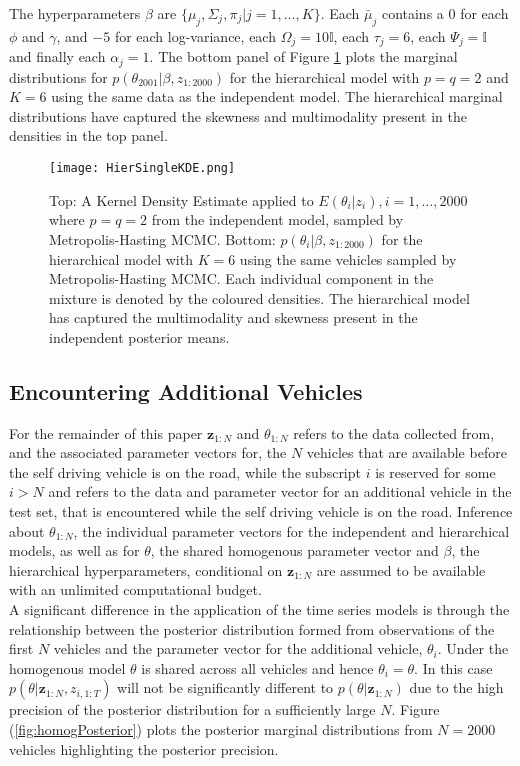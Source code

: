 \documentclass[12pt,a4paper]{article}\usepackage[]{graphicx}\usepackage[]{color}
\begin{document}
The hyperparameters $\beta$ are $\{\mu_j, \Sigma_j, \pi_j | j = 1, \dots, K\}$. Each $\bar{\mu}_j$ contains a $0$ for each $\phi$ and $\gamma$, and $-5$ for each log-variance, each $\Omega_j = 10 \mathbb{I}$, each $\tau_j = 6$, each $\Psi_j = \mathbb{I}$ and finally each $\alpha_j = 1$. The bottom panel of Figure \ref{fig:HierSingleKDE} plots the marginal distributions for $p(\theta_{2001} | \beta, z_{1:2000})$ for the hierarchical model with $p = q = 2$ and $K = 6$ using the same data as the independent model. The hierarchical marginal distributions have captured the skewness and multimodality present in the densities in the top panel.

\begin{figure}[ht]
\centering
\texttt{[image: HierSingleKDE.png]}
\caption{Top: A Kernel Density Estimate applied to $E(\theta_i | z_i), i = 1, \dots, 2000$ where $p = q = 2$ from the independent model, sampled by Metropolis-Hasting MCMC. Bottom: $p(\theta_i | \beta, z_{1:2000})$ for the hierarchical model with $K = 6$ using the same vehicles sampled by Metropolis-Hasting MCMC. Each individual component in the mixture is denoted by the coloured densities. The hierarchical model has captured the multimodality and skewness present in the independent posterior means.}
\label{fig:HierSingleKDE}
\end{figure}

\subsection{Encountering Additional Vehicles}
\label{subsec:additionalVehicles}

For the remainder of this paper $\textbf{z}_{1:N}$ and $\theta_{1:N}$ refers to the data collected from, and the associated parameter vectors for, the $N$ vehicles that are available before the self driving vehicle is on the road, while the subscript $i$ is reserved for some $i > N$ and refers to the data and parameter vector for an additional vehicle in the test set, that is encountered while the self driving vehicle is on the road.  Inference about $\theta_{1:N}$, the individual parameter vectors for the independent and hierarchical models, as well as for $\theta$, the shared homogenous parameter vector and $\beta$, the hierarchical hyperparameters, conditional on $\textbf{z}_{1:N}$ are assumed to be available with an unlimited computational budget.
\\

A significant difference in the application of the time series models is through the relationship between the posterior distribution formed from observations of the first $N$ vehicles and the parameter vector for the additional vehicle, $\theta_{i}$. Under the homogenous model $\theta$ is shared across all vehicles and hence $\theta_{i} = \theta$. In this case $p(\theta | \textbf{z}_{1:N}, z_{i, 1:T})$ will not be significantly different to $p(\theta | \textbf{z}_{1:N})$ due to the high precision of the posterior distribution for a sufficiently large $N$. Figure (\ref{fig:homogPosterior}) plots the posterior marginal distributions from $N = 2000$ vehicles highlighting the posterior precision.
\end{document}
